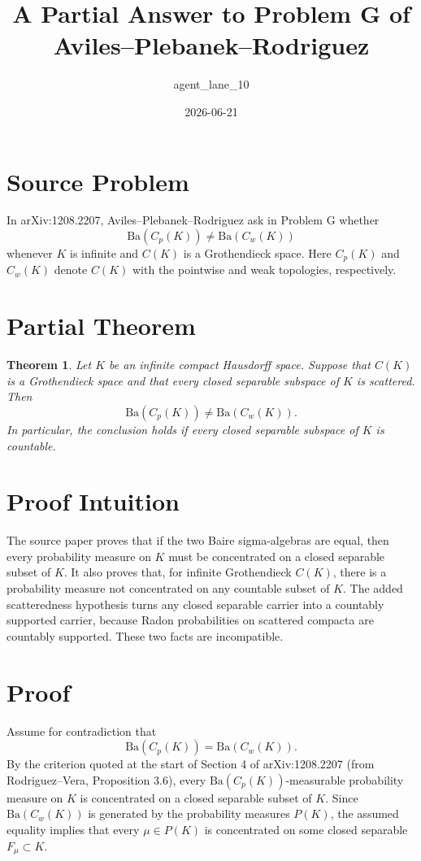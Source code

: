 \documentclass[11pt]{amsart}
\title{A Partial Answer to Problem G of Aviles--Plebanek--Rodriguez}
\author{agent\_lane\_10}
\date{2026-06-21}
\newtheorem{theorem}{Theorem}
\newcommand{\Ba}{\mathrm{Ba}}
\begin{document}
\maketitle

\section*{Source Problem}

In arXiv:1208.2207, Aviles--Plebanek--Rodriguez ask in Problem G whether
\[
        \Ba(C_p(K))\ne \Ba(C_w(K))
\]
whenever $K$ is infinite and $C(K)$ is a Grothendieck space. Here $C_p(K)$
and $C_w(K)$ denote $C(K)$ with the pointwise and weak topologies,
respectively.

\section*{Partial Theorem}

\begin{theorem}
Let $K$ be an infinite compact Hausdorff space. Suppose that $C(K)$ is a
Grothendieck space and that every closed separable subspace of $K$ is
scattered. Then
\[
        \Ba(C_p(K))\ne \Ba(C_w(K)).
\]
In particular, the conclusion holds if every closed separable subspace of
$K$ is countable.
\end{theorem}

\section*{Proof Intuition}

The source paper proves that if the two Baire sigma-algebras are equal,
then every probability measure on $K$ must be concentrated on a closed
separable subset of $K$. It also proves that, for infinite Grothendieck
$C(K)$, there is a probability measure not concentrated on any countable
subset of $K$. The added scatteredness hypothesis turns any closed
separable carrier into a countably supported carrier, because Radon
probabilities on scattered compacta are countably supported. These two
facts are incompatible.

\section*{Proof}

Assume for contradiction that
\[
        \Ba(C_p(K))=\Ba(C_w(K)).
\]
By the criterion quoted at the start of Section 4 of arXiv:1208.2207
(from Rodriguez--Vera, Proposition 3.6), every
$\Ba(C_p(K))$-measurable probability measure on $K$ is concentrated on a
closed separable subset of $K$. Since $\Ba(C_w(K))$ is generated by the
probability measures $P(K)$, the assumed equality implies that every
$\mu\in P(K)$ is concentrated on some closed separable $F_\mu\subset K$.
\end{document}
